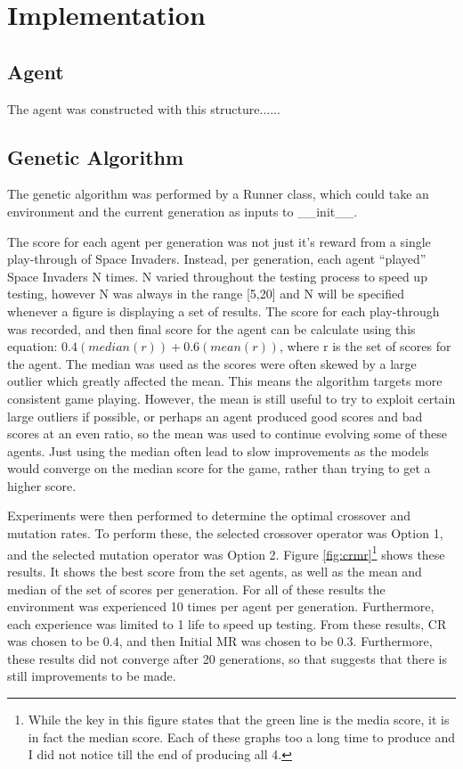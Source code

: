 \chapter{Implementation}

\section{Agent}

The agent was constructed with this structure......

\section{Genetic Algorithm}

The genetic algorithm was performed by a Runner class, which could take an environment and the current generation as inputs to \_\_init\_\_.

The score for each agent per generation was not just it's reward from a single play-through of Space Invaders. Instead, per generation, each agent ``played'' Space Invaders N times. N varied throughout the testing process to speed up testing, however N was always in the range [5,20] and N will be specified whenever a figure is displaying a set of results. The score for each play-through was recorded, and then final score for the agent can be calculate using this equation: $0.4(median(r)) + 0.6(mean(r))$, where r is the set of scores for the agent. The median was used as the scores were often skewed by a large outlier which greatly affected the mean. This means the algorithm targets more consistent game playing. However, the mean is still useful to try to exploit certain large outliers if possible, or perhaps an agent produced good scores and bad scores at an even ratio, so the mean was used to continue evolving some of these agents. Just using the median often lead to slow improvements as the models would converge on the median score for the game, rather than trying to get a higher score.

Experiments were then performed to determine the optimal crossover and mutation rates. To perform these, the selected crossover operator was Option 1, and the selected mutation operator was Option 2. Figure \ref{fig:crmr}\footnote{While the key in this figure states that the green line is the media score, it is in fact the median score. Each of these graphs too a long time to produce and I did not notice till the end of producing all 4.} shows these results. It shows the best score from the set agents, as well as the mean and median of the set of scores per generation. For all of these results the environment was experienced 10 times per agent per generation. Furthermore, each experience was limited to 1 life to speed up testing. From these results, CR was chosen to be $0.4$, and then Initial MR was chosen to be $0.3$. Furthermore, these results did not converge after 20 generations, so that suggests that there is still improvements to be made.

